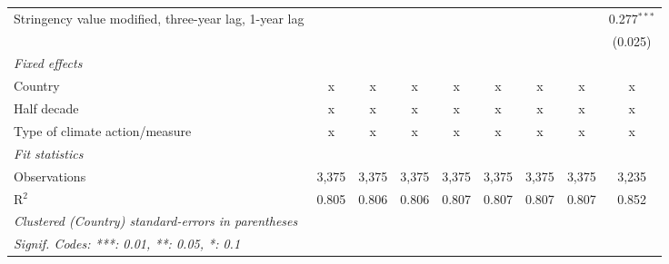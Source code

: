 \begin{table}[htbp]
\begin{tabular}{lcccccccc}
      Stringency value modified, three-year lag, 1-year lag                       &               &                &                &                &                &                &                & 0.277$^{***}$\\   
                                                                                  &               &                &                &                &                &                &                & (0.025)\\   
      \emph{Fixed effects}\\
      Country                                                                     & x             & x              & x              & x              & x              & x              & x              & x\\  
      Half decade                                                                 & x             & x              & x              & x              & x              & x              & x              & x\\  
      Type of climate action/measure                                              & x             & x              & x              & x              & x              & x              & x              & x\\  
      \midrule \emph{Fit statistics}\\
      Observations                                                                & 3,375         & 3,375          & 3,375          & 3,375          & 3,375          & 3,375          & 3,375          & 3,235\\  
      R$^2$                                                                       & 0.805         & 0.806          & 0.806          & 0.807          & 0.807          & 0.807          & 0.807          & 0.852\\  
      \midrule
      \multicolumn{9}{l}{\emph{Clustered (Country) standard-errors in parentheses}}\\
      \multicolumn{9}{l}{\emph{Signif. Codes: ***: 0.01, **: 0.05, *: 0.1}}\\
   \end{tabular}
\end{table}


